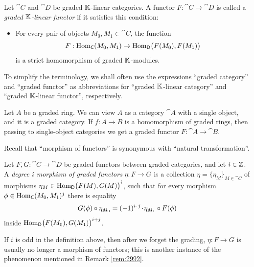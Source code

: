 \begin{dfn} \label{dfn:1694}
Let $\cat{C}$ and $\cat{D}$ be graded $\mathbb{K}$-linear categories. 
A functor $F : \cat{C} \to \cat{D}$
is called a 
{\em graded $\mathbb{K}$-linear functor}%
if it satisfies this condition: 
\begin{itemize}
\item[$\vartriangleright$] For every pair of objects $M_0, M_1 \in \cat{C}$, 
the function 
\[ F : \operatorname{Hom}_{\operatorname{\mathsf{C}}}(M_0, M_1) \to  
\operatorname{Hom}_{\operatorname{\mathsf{D}}} \bigl( F(M_0), F(M_1) \bigr) \] 
is a strict homomorphism of graded $\mathbb{K}$-modules. 
\end{itemize}
\end{dfn}

\begin{conv} \label{conv:4625}
To simplify the terminology, we shall often use the expressions ``graded 
category'' and ``graded functor'' as abbreviations for ``graded $\mathbb{K}$-linear
category'' and ``graded $\mathbb{K}$-linear functor'', respectively. 
\end{conv}
 
\begin{exa} \label{exa:1694}
Let $A$ be a graded ring. We can view $A$ as a category 
$\cat{A}$ with a single object, and it is a graded category.
If $f : A \to B$ is a homomorphism of graded rings, then 
passing to single-object categories we get a 
graded functor $F : \cat{A} \to \cat{B}$. 
\end{exa}

Recall that ``morphism of functors'' is synonymous with ``natural 
transformation''. 

\begin{dfn} \label{dfn:1695}
Let  $F, G : \cat{C} \to \cat{D}$
be graded functors between graded categories, and let $i \in \mathbb{Z}$. 
A {\em degree $i$ morphism of graded functors}%
$\eta : F \to G$ is a collection 
$\eta = \{ \eta_M \}_{M \in \cat{C}}$ of morphisms 
$\eta_M \in \operatorname{Hom}_{\operatorname{\mathsf{D}}} \bigl( F(M), G(M) \bigr)^i$,
such that for every morphism 
$\phi \in \operatorname{Hom}_{\operatorname{\mathsf{C}}} (M_0, M_1)^j$ there is equality 
\[ G(\phi) \circ \eta_{M_0} = (-1)^{i \mspace{1.5mu}{\cdot}\mspace{1.5mu} j} \mspace{1.5mu}{\cdot}\mspace{1.5mu}  \eta_{M_1} \circ F(\phi) \]
inside 
$\operatorname{Hom}_{\operatorname{\mathsf{D}}} \bigl( F(M_0), G(M_1) \bigr)^{i + j}$.
\end{dfn}

If $i$ is odd in the definition above, then after we forget the grading, 
$\eta : F \to G$ is usually no longer a morphism of functors; this is another 
instance of the phenomenon mentioned in Remark \ref{rem:2992}.

